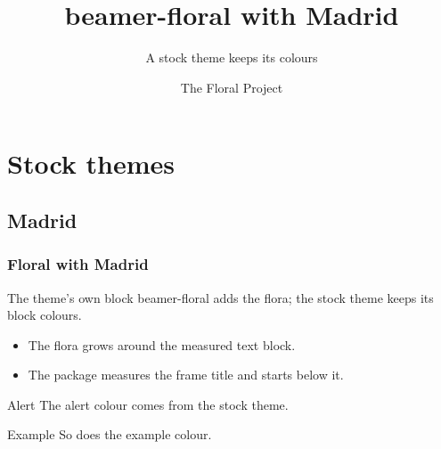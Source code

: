 \documentclass[aspectratio=169]{beamer}
\title{beamer-floral with Madrid}
\subtitle{A stock theme keeps its colours}
\author{The Floral Project}
\institute{beamer-floral}
\date{}
\begin{document}
\begin{frame}[plain]\titlepage\end{frame}
\section{Stock themes}\subsection{Madrid}
\begin{frame}
  \frametitle{Floral with Madrid}
  \begin{block}{The theme's own block}
    beamer-floral adds the flora; the stock theme keeps its block colours.
  \end{block}
  \begin{itemize}
    \item The flora grows around the measured text block.
    \item The package measures the frame title and starts below it.
  \end{itemize}
  \begin{alertblock}{Alert}
    The alert colour comes from the stock theme.
  \end{alertblock}
  \begin{exampleblock}{Example}
    So does the example colour.
  \end{exampleblock}
\end{frame}
\end{document}
